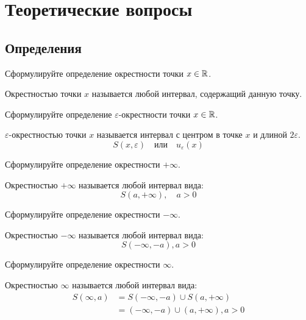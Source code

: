 
\section{Теоретические вопросы}

\subsection{Определения}

\begin{question}
  Сформулируйте определение окрестности точки $x \in \mathbb{R}$. 
\end{question}
\begin{answer}
  Окрестностью точки $x$ называется любой интервал, содержащий данную точку.
\end{answer}

\begin{question}
  Сформулируйте определение $\varepsilon$-окрестности точки $x \in \mathbb{R}$.
\end{question}
\begin{answer}
  $\varepsilon$-окрестностью точки $x$ называется интервал с центром в точке $x$ и длиной $2\varepsilon$. \[
    S(x, \varepsilon) \quad \text{или} \quad u_{\varepsilon}(x)
  \] 
\end{answer}

\begin{question}
   Сформулируйте определение окрестности $+\infty$.
\end{question}
\begin{answer}
  Окрестностью $+\infty$ называется любой интервал вида: \[
  S(a, +\infty), \quad a > 0
  \] 
\end{answer}

\begin{question}
   Сформулируйте определение окрестности $-\infty$.
\end{question}
\begin{answer}
  Окрестностью $-\infty$ называется любой интервал вида: \[
  S(-\infty, -a), a > 0
  \] 
\end{answer}

\begin{question}
   Сформулируйте определение окрестности $\infty$.
\end{question}
\begin{answer}
  Окрестностью $\infty$ называется любой интервал вида:
  \begin{align*}
    S(\infty, a) &= S(-\infty, -a) \cup S(a, +\infty) \\
            &= (-\infty, -a) \cup (a, +\infty), a > 0
  \end{align*}
\end{answer}

